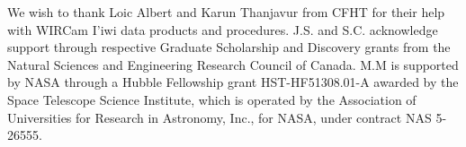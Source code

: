 \documentclass[iop]{emulateapj}
\begin{document}
\bigskip We wish to thank Loic Albert and Karun Thanjavur from CFHT for their help with WIRCam I'iwi data products and procedures.
J.S. and S.C. acknowledge support through respective Graduate Scholarship and Discovery grants from the Natural Sciences and Engineering Research Council of Canada.
M.M is supported by NASA through a Hubble Fellowship grant HST-HF51308.01-A awarded by the Space Telescope Science Institute, which is operated by the Association of Universities for Research in Astronomy, Inc., for NASA, under contract NAS 5-26555.


\end{document}
